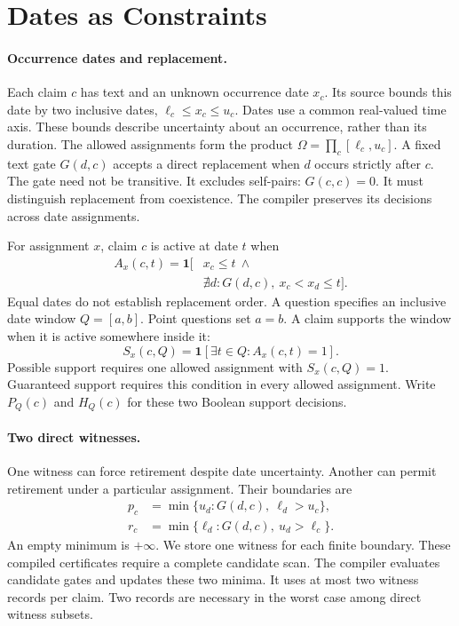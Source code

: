 \section{Dates as Constraints}
\label{sec:theory}

\paragraph{Occurrence dates and replacement.}
Each claim $c$ has text and an unknown occurrence date $x_c$.
Its source bounds this date by two inclusive dates, $\ell_c\leq x_c\leq u_c$.
Dates use a common real-valued time axis.
These bounds describe uncertainty about an occurrence, rather than its duration.
The allowed assignments form the product
$\Omega=\prod_c[\ell_c,u_c]$.
A fixed text gate $G(d,c)$ accepts a direct replacement when $d$ occurs strictly after $c$.
The gate need not be transitive.
It excludes self-pairs: $G(c,c)=0$.
It must distinguish replacement from coexistence.
The compiler preserves its decisions across date assignments.

For assignment $x$, claim $c$ is active at date $t$ when
\begin{equation}
\begin{split}
 A_x(c,t)=\mathbf{1}[&x_c\leq t\ \land\\
 &\nexists d:G(d,c),\ x_c<x_d\leq t].
\end{split}
\label{eq:uncertain-active}
\end{equation}
Equal dates do not establish replacement order.
A question specifies an inclusive date window $Q=[a,b]$.
Point questions set $a=b$.
A claim supports the window when it is active somewhere inside it:
\begin{equation}
 S_x(c,Q)=\mathbf{1}[\exists t\in Q:A_x(c,t)=1].
\end{equation}
Possible support requires one allowed assignment with $S_x(c,Q)=1$.
Guaranteed support requires this condition in every allowed assignment.
Write $P_Q(c)$ and $H_Q(c)$ for these two Boolean support decisions.

\paragraph{Two direct witnesses.}
One witness can force retirement despite date uncertainty.
Another can permit retirement under a particular assignment.
Their boundaries are
\begin{align}
 p_c&=\min\{u_d:G(d,c),\ \ell_d>u_c\},\label{eq:possible-boundary}\\
 r_c&=\min\{\ell_d:G(d,c),\ u_d>\ell_c\}.\label{eq:certain-boundary}
\end{align}
An empty minimum is $+\infty$.
We store one witness for each finite boundary.
These compiled certificates require a complete candidate scan.
The compiler evaluates candidate gates and updates these two minima.
It uses at most two witness records per claim.
Two records are necessary in the worst case among direct witness subsets.


